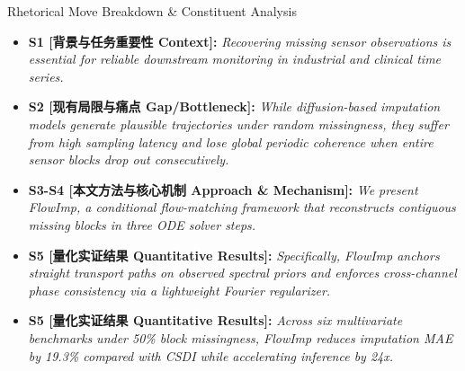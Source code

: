 \begin{TipBox}{Rhetorical Move Breakdown \& Constituent Analysis}
\begin{itemize}[leftmargin=1.5em]
  \item \textbf{S1 [背景与任务重要性 Context]:} \textit{Recovering missing sensor observations is essential for reliable downstream monitoring in industrial and clinical time series.}\par{}
  \item \textbf{S2 [现有局限与痛点 Gap/Bottleneck]:} \textit{While diffusion-based imputation models generate plausible trajectories under random missingness, they suffer from high sampling latency and lose global periodic coherence when entire sensor blocks drop out consecutively.}\par{}
  \item \textbf{S3-S4 [本文方法与核心机制 Approach \& Mechanism]:} \textit{We present FlowImp, a conditional flow-matching framework that reconstructs contiguous missing blocks in three ODE solver steps.}\par{}
  \item \textbf{S5 [量化实证结果 Quantitative Results]:} \textit{Specifically, FlowImp anchors straight transport paths on observed spectral priors and enforces cross-channel phase consistency via a lightweight Fourier regularizer.}\par{}
  \item \textbf{S5 [量化实证结果 Quantitative Results]:} \textit{Across six multivariate benchmarks under 50\% block missingness, FlowImp reduces imputation MAE by 19.3\% compared with CSDI while accelerating inference by 24x.}\par{}
\end{itemize}
\end{TipBox}
\medskip

